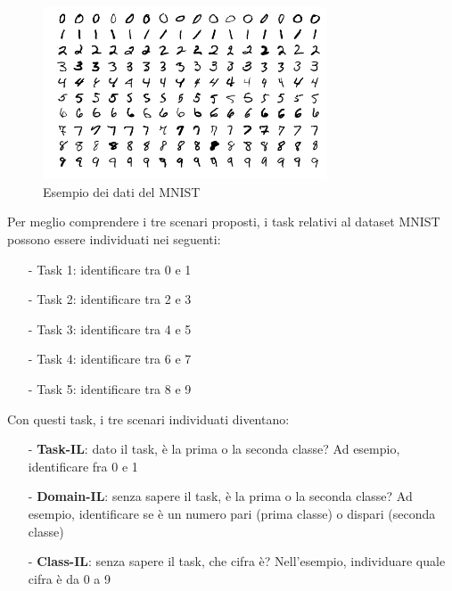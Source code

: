 \begin{figure}[h]
	\begin{center}
		\includegraphics[width=0.75\textwidth]{img/MnistExamples.png}
		\caption{Esempio dei dati del MNIST}
		\label{fig:mnistexamples}
	\end{center}
\end{figure}
Per meglio comprendere i tre scenari proposti, i task relativi al dataset MNIST possono essere individuati nei seguenti:
\begin{itemize}
    \item[-] Task 1: identificare tra 0 e 1
    \item[-] Task 2: identificare tra 2 e 3
    \item[-] Task 3: identificare tra 4 e 5
    \item[-] Task 4: identificare tra 6 e 7
    \item[-] Task 5: identificare tra 8 e 9
\end{itemize}
Con questi task, i tre scenari individuati diventano:
\begin{itemize}
    \item[-] \textbf{Task-IL}: dato il task, è la prima o la seconda classe? Ad esempio, identificare fra 0 e 1
    \item[-] \textbf{Domain-IL}: senza sapere il task, è la prima o la seconda classe? Ad esempio, identificare se è un numero pari (prima classe) o dispari (seconda classe)
    \item[-] \textbf{Class-IL}: senza sapere il task, che cifra è? Nell'esempio, individuare quale cifra è da 0 a 9
\end{itemize}
